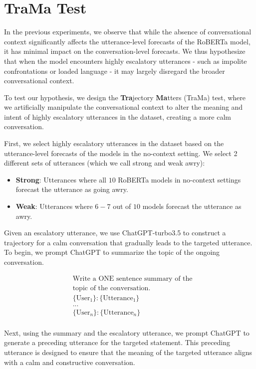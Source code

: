 \section{TraMa Test}

In the previous experiments, we observe that while the absence of conversational context significantly affects the utterance-level forecasts of the RoBERTa model, it has minimal impact on the conversation-level forecasts. 
We thus hypothesize that when the model encounters highly escalatory utterances - such as impolite confrontations or loaded language - it may largely disregard the broader conversational context.

To test our hypothesis, we design the \textbf{Tra}jectory \textbf{Ma}tters (TraMa) test, where we artificially manipulate the conversational context to alter the meaning and intent of highly escalatory utterances in the dataset, creating a more calm conversation.

First, we select highly escalatory utterances in the dataset based on the utterance-level forecasts of the models in the no-context setting. We select 2 different sets of utterances (which we call strong and weak awry):
\begin{itemize}
    \item \textbf{Strong}: Utterances where all $10$ RoBERTa models in no-context settings forecast the utterance as going awry.

    \item \textbf{Weak}: Utterances where $6-7$ out of $10$ models forecast the utterance as awry.
\end{itemize}

Given an escalatory utterance, we use ChatGPT-turbo3.5 to construct a trajectory for a calm conversation that gradually leads to the targeted utterance. To begin, we prompt ChatGPT to summarize the topic of the ongoing conversation.

{\ttfamily
\begin{align*}
& \text{Write a ONE sentence summary of the}\\
& \text{topic of the conversation.}\\
& \{\text{User}_1\} : \{\text{Utterance}_1\}\\
& ...\\
& \{\text{User}_n\} : \{\text{Utterance}_n\}\\
\end{align*}
}

Next, using the summary and the escalatory utterance, we prompt ChatGPT to generate a preceding utterance for the targeted statement. This preceding utterance is designed to ensure that the meaning of the targeted utterance aligns with a calm and constructive conversation.

